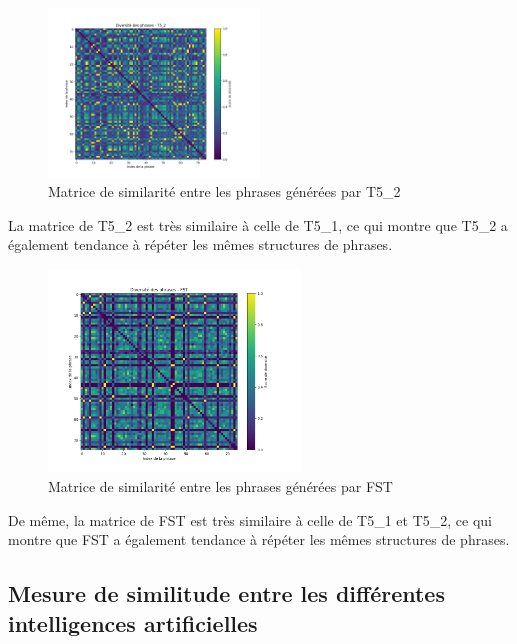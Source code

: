 \documentclass[conference]{IEEEtran}
\begin{document}
\vspace{5mm}

\begin{figure}[H]
\centering
\includegraphics[width=0.5\textwidth]{images/diversity_matrix_t5_2.png}
\caption{Matrice de similarité entre les phrases générées par T5\_2}
\end{figure}

\vspace{5mm}

La matrice de T5\_2 est très similaire à celle de T5\_1, ce qui montre que T5\_2 a également tendance à répéter les mêmes structures de phrases.

\vspace{5mm}

\begin{figure}[H]
\centering
\includegraphics[width=0.6\textwidth]{images/diversity_matrix_FST.png}
\caption{Matrice de similarité entre les phrases générées par FST}
\end{figure}

\vspace{5mm}

De même, la matrice de FST est très similaire à celle de T5\_1 et T5\_2, ce qui montre que FST a également tendance à répéter les mêmes structures de phrases.

\subsection {Mesure de similitude entre les différentes intelligences artificielles}
\end{document}

